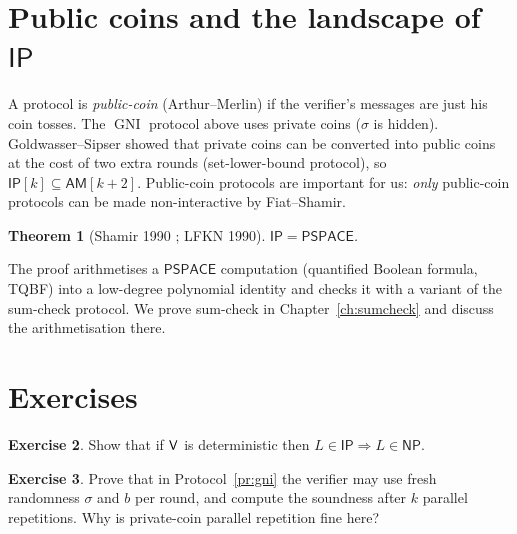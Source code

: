 \documentclass[11pt,a4paper]{report}
\theoremstyle{plain}
\newtheorem{theorem}{Theorem}[chapter]
\theoremstyle{definition}
\newtheorem{exercise}[theorem]{Exercise}
\theoremstyle{remark}
\newcommand{\NP}{\mathsf{NP}}\newcommand{\BPP}{\mathsf{BPP}}\newcommand{\IP}{\mathsf{IP}}
\newcommand{\PSPACE}{\mathsf{PSPACE}}\newcommand{\AM}{\mathsf{AM}}\newcommand{\coAM}{\mathsf{coAM}}
\DeclareMathOperator{\GI}{GI}\DeclareMathOperator{\GNI}{GNI}
\DeclareMathOperator{\QR}{QR}\DeclareMathOperator{\QNR}{QNR}
\begin{document}
\section{Public coins and the landscape of \texorpdfstring{$\IP$}{IP}}
A protocol is \emph{public-coin} (Arthur--Merlin) if the verifier's messages are just his coin tosses. The $\GNI$ protocol above uses private coins ($\sigma$ is hidden). Goldwasser--Sipser showed that private coins can be converted into public coins at the cost of two extra rounds (set-lower-bound protocol), so $\IP[k]\subseteq\AM[k+2]$. Public-coin protocols are important for us: \emph{only} public-coin protocols can be made non-interactive by Fiat--Shamir.

\begin{theorem}[Shamir 1990 \cite{Sha92}; LFKN 1990]
$\IP=\PSPACE$.
\end{theorem}
The proof arithmetises a $\PSPACE$ computation (quantified Boolean formula, TQBF) into a low-degree polynomial identity and checks it with a variant of the sum-check protocol. We prove sum-check in Chapter~\ref{ch:sumcheck} and discuss the arithmetisation there.

\begin{center}
\end{center}

\section*{Exercises}
\begin{exercise}\label{ex:detv}
Show that if $\mathsf{V}$ is deterministic then $L\in\IP\Rightarrow L\in\NP$.
\end{exercise}
\begin{exercise}
Prove that in Protocol~\ref{pr:gni} the verifier may use fresh randomness $\sigma$ and $b$ per round, and compute the soundness after $k$ parallel repetitions. Why is private-coin parallel repetition fine here?
\end{exercise}
\end{document}
